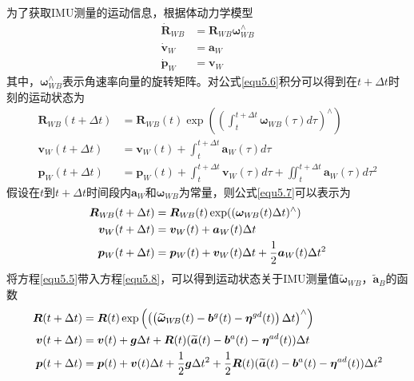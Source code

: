 为了获取IMU测量的运动信息，根据体动力学模型
\begin{equation}
\label{equ5.6}
\begin{aligned}
\dot{\boldsymbol{R}}_{W\!B} &= \boldsymbol{R}_{W\!B}{\boldsymbol{\omega}}_{W\!B}^{\wedge}\\
\dot{\boldsymbol{v}}_W &= \boldsymbol{a}_W \\
\dot{\boldsymbol{p}}_W &= \boldsymbol{v}_W
\end{aligned}
\end{equation}
其中，${\boldsymbol{\omega}}_{W\!B}^{\wedge}$表示角速率向量的旋转矩阵。对公式\eqref{equ5.6}积分可以得到在$t+\Delta t$时刻的运动状态为
\begin{equation}
\label{equ5.7}
\begin{aligned}
\boldsymbol{R}_{W\!B}(t+\Delta t) &= \boldsymbol{R}_{W\!B}(t)\exp\left( { \left( \int_t^{t+\Delta t} \! \boldsymbol{\omega}_{W\!B}(\tau) d\tau \right)^{\wedge} } \right) \\
\boldsymbol{v}_W(t+\Delta t) &= \boldsymbol{v}_W(t) + \int_t^{t+\Delta t} \! \boldsymbol{a}_W(\tau) d\tau 
\\
\boldsymbol{p}_W(t+\Delta t) &= \boldsymbol{p}_W(t) + \int_t^{t+\Delta t} \! \boldsymbol{v}_W(\tau) d\tau + \iint_t^{t+\Delta t} \! \boldsymbol{a}_W(\tau)d\tau ^2
\end{aligned}
\end{equation}
假设在$t$到$t+\Delta t$时间段内$\boldsymbol{a}_W$和$\boldsymbol{\omega}_{W\!B}$为常量，则公式\eqref{equ5.7}可以表示为
\begin{equation}
\label{equ5.8}
\begin{aligned}
\boldsymbol{R}_{W\!B}(t+\Delta t) &= \boldsymbol{R}_{W\!B}(t) \exp(( \boldsymbol{\omega}_{W\!B}(t)\Delta t )^{\wedge}) \\
\boldsymbol{v}_W(t+\Delta t) &= \boldsymbol{v}_W(t)+\boldsymbol{a}_W(t)\Delta t \\
\boldsymbol{p}_W(t+\Delta t) &= \boldsymbol{p}_W(t)+\boldsymbol{v}_W(t)\Delta t + {1 \over 2} \boldsymbol{a}_W(t)\Delta t^2
\end{aligned}
\end{equation}
将方程\eqref{equ5.5}带入方程\eqref{equ5.8}，可以得到运动状态关于IMU测量值$\widetilde{\boldsymbol{\omega}}_{W\!B}$，$\widetilde{\boldsymbol{a}}_B$的函数
\begin{equation}
\label{equ5.9}
\begin{aligned}
\boldsymbol{R}(t+\Delta t) &= \boldsymbol{R}(t)\exp \left( \left(  \left( \widetilde{\boldsymbol{\omega}}_{W\!B}(t)-\boldsymbol{b}^g(t)-\boldsymbol{\eta}^{gd}(t) \right) \Delta t \right)^{\wedge}  \right) \\ 
\boldsymbol{v}(t+\Delta t) &= \boldsymbol{v}(t)+\boldsymbol{g} \Delta t + \boldsymbol{R}(t)(\widetilde{\boldsymbol{a}}(t)-\boldsymbol{b}^a(t)-\boldsymbol{\eta}^{ad}(t))\Delta t \\
\boldsymbol{p}(t+\Delta t) &= \boldsymbol{p}(t)+\boldsymbol{v}(t)\Delta t + {1 \over 2}\boldsymbol{g}\Delta t^2 + {1 \over 2}\boldsymbol{R}(t)(\widetilde{\boldsymbol{a}}(t)-\boldsymbol{b}^a(t)-\boldsymbol{\eta}^{ad}(t))\Delta t^2
\end{aligned}
\end{equation}
